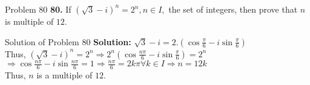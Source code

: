 \documentclass[aspectratio=169,8pt]{beamer}
\begin{document}
\begin{frame}{Problem 80}
  \textbf{80.} If $(\sqrt{3} - i)^n = 2^n, n\in I,$ the set of integers, then prove that $n$ is multiple of $12.$
\end{frame}
\begin{frame}{Solution of Problem 80}
  \textbf{Solution:} $\sqrt{3} - i = 2.\left(\cos\frac{\pi}{6} - i\sin\frac{\pi}{6}\right)$\\
  \vspace*{0.2cm}
  Thus, $(\sqrt{3} - i)^n = 2^n \Rightarrow 2^n\left(\cos\frac{n\pi}{6} - i\sin\frac{\pi}{6}\right) = 2^n$\\
  \vspace*{0.2cm}
  $\Rightarrow \cos\frac{n\pi}{6} - i\sin\frac{n\pi}{6} = 1 \Rightarrow \frac{n\pi}{6} = 2k\pi \forall k\in I \Rightarrow n = 12k$\\
  \vspace*{0.2cm}
  Thus, $n$ is a multiple of $12.$
\end{frame}
\end{document}
